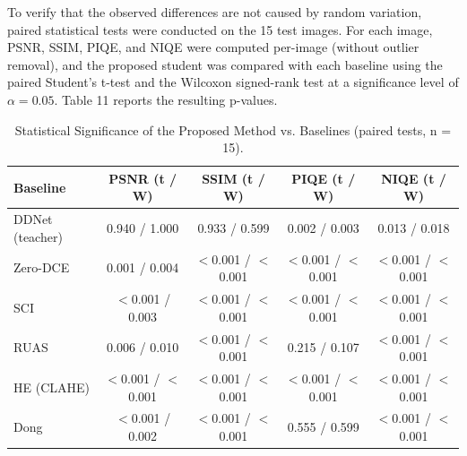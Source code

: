 \documentclass[sensors,article,submit,moreauthors]{Definitions/mdpi}
\begin{document}
To verify that the observed differences are not caused by random variation, paired statistical tests were conducted on the 15 test images. For each image, PSNR, SSIM, PIQE, and NIQE were computed per-image (without outlier removal), and the proposed student was compared with each baseline using the paired Student's t-test and the Wilcoxon signed-rank test at a significance level of $\alpha = 0.05$. Table 11 reports the resulting p-values.

\begin{table}[H]
\caption{Statistical Significance of the Proposed Method vs. Baselines (paired tests, n = 15).\label{tab11}}
\begin{tabularx}{\textwidth}{LCCCC}
\toprule
\textbf{Baseline}	& \textbf{PSNR (t / W)}	& \textbf{SSIM (t / W)}	& \textbf{PIQE (t / W)}	& \textbf{NIQE (t / W)}\\
\midrule
DDNet (teacher) \cite{ref25}	& 0.940 / 1.000	& 0.933 / 0.599	& 0.002 / 0.003	& 0.013 / 0.018\\
Zero-DCE \cite{ref26}	& 0.001 / 0.004	& $<$0.001 / $<$0.001	& $<$0.001 / $<$0.001	& $<$0.001 / $<$0.001\\
SCI \cite{ref27}	& $<$0.001 / 0.003	& $<$0.001 / $<$0.001	& $<$0.001 / $<$0.001	& $<$0.001 / $<$0.001\\
RUAS \cite{ref9}	& 0.006 / 0.010	& $<$0.001 / $<$0.001	& 0.215 / 0.107	& $<$0.001 / $<$0.001\\
HE (CLAHE) \cite{ref28}	& $<$0.001 / $<$0.001	& $<$0.001 / $<$0.001	& $<$0.001 / $<$0.001	& $<$0.001 / $<$0.001\\
Dong \cite{ref29}	& $<$0.001 / 0.002	& $<$0.001 / $<$0.001	& 0.555 / 0.599	& $<$0.001 / $<$0.001\\
\bottomrule
\end{tabularx}
\end{table}
\end{document}

